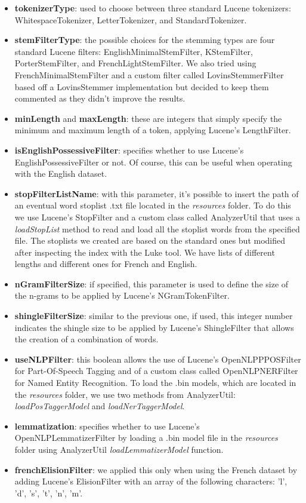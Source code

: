 \begin{itemize}
  \item \textbf{tokenizerType}: used to choose between three standard Lucene tokenizers: WhitespaceTokenizer, LetterTokenizer, and StandardTokenizer.
  \item \textbf{stemFilterType}: the possible choices for the stemming types are four standard Lucene filters: EnglishMinimalStemFilter, KStemFilter, PorterStemFilter, and FrenchLightStemFilter. We also tried using FrenchMinimalStemFilter and a custom filter called LovinsStemmerFilter based off a LovinsStemmer implementation but decided to keep them commented as they didn't improve the results.
  \item \textbf{minLength} and \textbf{maxLength}: these are integers that simply specify the minimum and maximum length of a token, applying Lucene's LengthFilter.
  \item \textbf{isEnglishPossessiveFilter}: specifies whether to use Lucene's EnglishPossessiveFilter or not. Of course, this can be useful when operating with the English dataset.
  \item \textbf{stopFilterListName}: with this parameter, it's possible to insert the path of an eventual word stoplist .txt file located in the \textit{resources} folder. To do this we use Lucene's StopFilter and a custom class called AnalyzerUtil that uses a \textit{loadStopList} method to read and load all the stoplist words from the specified file. The stoplists we created are based on the standard ones but modified after inspecting the index with the Luke tool. We have lists of different lengths and different ones for French and English.
  \item \textbf{nGramFilterSize}: if specified, this parameter is used to define the size of the n-grams to be applied by Lucene's NGramTokenFilter.
  \item \textbf{shingleFilterSize}: similar to the previous one, if used, this integer number indicates the shingle size to be applied by Lucene's ShingleFilter that allows the creation of a combination of words.
  \item \textbf{useNLPFilter}: this boolean allows the use of Lucene's OpenNLPPPOSFilter for Part-Of-Speech Tagging and of a custom class called OpenNLPNERFilter for Named Entity Recognition. To load the .bin models, which are located in the \textit{resources} folder, we use two methods from AnalyzerUtil: \textit{loadPosTaggerModel} and \textit{loadNerTaggerModel}.
  \item \textbf{lemmatization}: specifies whether to use Lucene's OpenNLPLemmatizerFilter by loading a .bin model file in the \textit{resources} folder using AnalyzerUtil \textit{loadLemmatizerModel} function.
  \item \textbf{frenchElisionFilter}: we applied this only when using the French dataset by adding Lucene's ElisionFilter with an array of the following characters: 'l', 'd', 's', 't', 'n', 'm'.
\end{itemize}
